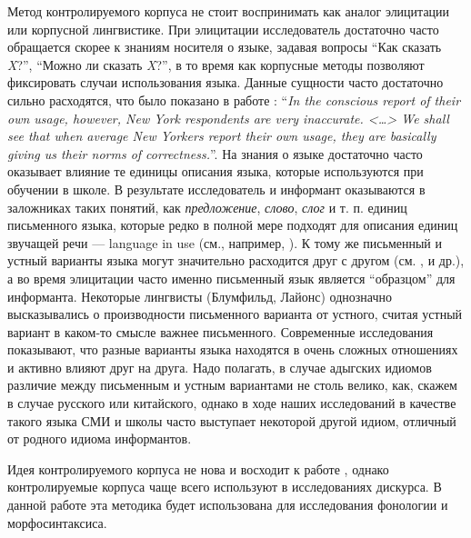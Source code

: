 Метод контролируемого корпуса не стоит воспринимать как аналог элицитации или корпусной лингвистике. При элицитации исследователь достаточно часто обращается скорее к знаниям носителя о языке, задавая вопросы ``Как сказать \textit{X}?'', ``Можно ли сказать \textit{X}?'', в то время как корпусные методы позволяют фиксировать случаи использования языка. Данные сущности часто достаточно сильно расходятся, что было показано в работе \citep[300]{labov64}: ``\textit{In the conscious report of their own usage, however, New York respondents are very inaccurate. <\dots> We shall see that when average New Yorkers report their own usage, they are basically giving us their norms of correctness.}''. На знания о языке достаточно часто оказывает влияние те единицы описания языка, которые используются при обучении в школе. В результате исследователь и информант оказываются в заложниках таких понятий, как \textit{предложение}, \textit{слово}, \textit{слог} и т. п. единиц письменного языка, которые редко в полной мере подходят для описания единиц звучащей речи --- language in use (см., например, \citep{miller98}). К тому же письменный и устный варианты языка могут значительно расходится друг с другом (см. \cite[40-42]{lyons68}, \citep{tannen82} и др.), а во время элицитации часто именно письменный язык является ``образцом'' для информанта. Некоторые лингвисты (Блумфильд, Лайонс) однозначно высказывались о производности письменного варианта от устного, считая устный вариант в каком-то смысле важнее письменного. Современные исследования показывают, что разные варианты языка находятся в очень сложных отношениях и активно влияют друг на друга. Надо полагать, в случае адыгских идиомов различие между письменным и устным вариантами не столь велико, как, скажем в случае русского или китайского, однако в ходе наших исследований в качестве такого языка СМИ и школы часто выступает некоторой другой идиом, отличный от родного идиома информантов.
\par Идея контролируемого корпуса не нова и восходит к работе \citep{chafe80}, однако контролируемые корпуса чаще всего используют в исследованиях дискурса. В данной работе эта методика будет использована для исследования фонологии и морфосинтаксиса.
